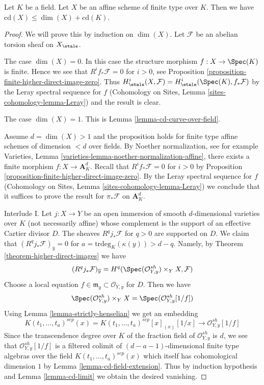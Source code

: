 \begin{proposition}
\label{proposition-cd-affine}
Let $K$ be a field. Let $X$ be an affine scheme of finite type over $K$.
Then we have $\text{cd}(X) \leq \dim(X) + \text{cd}(K)$.
\end{proposition}

\begin{proof}
We will prove this by induction on $\dim(X)$.
Let $\mathcal{F}$ be an abelian torsion sheaf on $X_\etale$.

\medskip\noindent
The case $\dim(X) = 0$. In this case the structure morphism
$f : X \to \Spec(K)$ is finite. Hence we see that $R^if_*\mathcal{F} = 0$
for $i > 0$, see Proposition \ref{proposition-finite-higher-direct-image-zero}.
Thus $H^i_\etale(X, \mathcal{F}) = H^i_\etale(\Spec(K), f_*\mathcal{F})$
by the Leray spectral sequence for $f$
(Cohomology on Sites, Lemma \ref{sites-cohomology-lemma-Leray})
and the result is clear.

\medskip\noindent
The case $\dim(X) = 1$. This is Lemma \ref{lemma-cd-curve-over-field}.

\medskip\noindent
Assume $d = \dim(X) > 1$ and the proposition holds for finite type
affine schemes of dimension $< d$ over fields.
By Noether normalization, see for example
Varieties, Lemma \ref{varieties-lemma-noether-normalization-affine},
there exists a finite morphism $f : X \to \mathbf{A}^d_K$.
Recall that $R^if_*\mathcal{F} = 0$ for $i > 0$ by
Proposition \ref{proposition-finite-higher-direct-image-zero}.
By the Leray spectral sequence for $f$
(Cohomology on Sites, Lemma \ref{sites-cohomology-lemma-Leray})
we conclude that it suffices to prove the result for $\pi_*\mathcal{F}$
on $\mathbf{A}^d_K$.

\medskip\noindent
Interlude I. Let $j : X \to Y$ be an open immersion of smooth
$d$-dimensional varieties over $K$ (not necessarily affine)
whose complement is the support of an effective Cartier divisor $D$.
The sheaves $R^qj_*\mathcal{F}$ for $q > 0$ are supported on $D$.
We claim that $(R^qj_*\mathcal{F})_{\overline{y}} = 0$
for $a = \text{trdeg}_K(\kappa(y)) > d - q$. Namely, by
Theorem \ref{theorem-higher-direct-images} we have
$$
(R^qj_*\mathcal{F})_{\overline{y}} =
H^q(\Spec(\mathcal{O}_{Y, y}^{sh}) \times_Y X, \mathcal{F})
$$
Choose a local equation $f \in \mathfrak m_y \subset \mathcal{O}_{Y, y}$
for $D$. Then we have
$$
\Spec(\mathcal{O}_{Y, y}^{sh}) \times_Y X =
\Spec(\mathcal{O}_{Y, y}^{sh}[1/f])
$$
Using Lemma \ref{lemma-strictly-henselian} we get an embedding
$$
K(t_1, \ldots, t_a)^{sep}(x) =
K(t_1, \ldots, t_a)^{sep}[x]_{(x)}[1/x]
\longrightarrow
\mathcal{O}_{Y, y}^{sh}[1/f]
$$
Since the transcendence degree over $K$ of the fraction field of
$\mathcal{O}_{Y, y}^{sh}$ is $d$, we see that $\mathcal{O}_{Y, y}^{sh}[1/f]$
is a filtered colimit of $(d - a - 1)$-dimensional finite type algebras over
the field $K(t_1, \ldots, t_a)^{sep}(x)$ which itself has cohomological
dimension $1$ by Lemma \ref{lemma-cd-field-extension}. Thus by induction
hypothesis and Lemma \ref{lemma-cd-limit}
we obtain the desired vanishing.


\end{proof}
